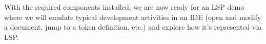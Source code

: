 With the required components installed, we are now ready for an LSP demo where we will emulate typical development activities in an IDE (open and modify a document, jump to a token definition, etc.) and explore how it's represented via LSP.










































































